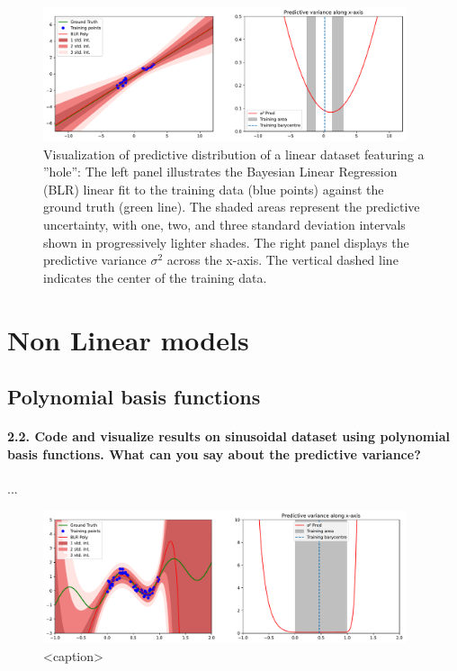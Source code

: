 \begin{figure}[H]
    \centering
    \includegraphics[width=0.95\textwidth]{phi_linear_hole.pdf}
    \caption{Visualization of predictive distribution of a linear dataset featuring a ''hole'': The left panel illustrates the Bayesian Linear Regression (BLR) linear fit to the training data (blue points) against the ground truth (green line). The shaded areas represent the predictive uncertainty, with one, two, and three standard deviation intervals shown in progressively lighter shades. The right panel displays the predictive variance $\sigma^2$ across the x-axis. The vertical dashed line indicates the center of the training data.    }
    \label{fig:phi_linear_hole}
\end{figure}

\section{Non Linear models}

\subsection{Polynomial basis functions}

\paragraph*{2.2. Code and visualize results on sinusoidal dataset using polynomial basis functions. What can you say about the predictive variance?}

...

\begin{figure}[H]
    \centering
    \includegraphics[width=0.95\textwidth]{phi_polynomial.pdf}
    \caption{<caption>}
    \label{fig:phi_polynomial}
\end{figure}

